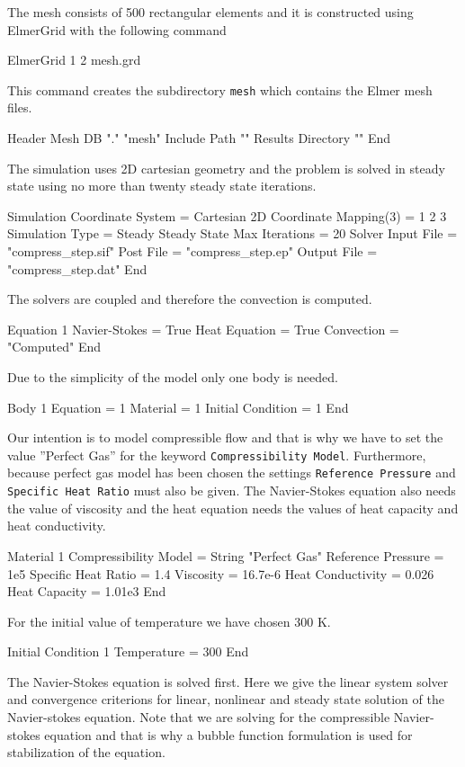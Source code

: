 \begin{flushleft}

The mesh consists of 500 rectangular elements and it is constructed using ElmerGrid with the following command

\ttbegin
ElmerGrid 1 2 mesh.grd
\ttend

This command creates the subdirectory {\tt mesh} which contains the Elmer mesh files.

\ttbegin
Header
  Mesh DB "." "mesh"
  Include Path ""
  Results Directory ""
End
\ttend

The simulation uses 2D cartesian geometry and the problem is solved in steady state using no more than twenty steady state iterations.

\ttbegin
Simulation
  Coordinate System =  Cartesian 2D
  Coordinate Mapping(3) = 1 2 3
  Simulation Type = Steady
  Steady State Max Iterations = 20
  Solver Input File = "compress_step.sif"
  Post File = "compress_step.ep"
  Output File = "compress_step.dat"
End
\ttend

The solvers are coupled and therefore the convection is computed. 

\ttbegin
Equation 1
  Navier-Stokes = True
  Heat Equation = True
  Convection = "Computed"
End
\ttend

Due to the simplicity of the model only one body is needed.

\ttbegin
Body 1
  Equation = 1
  Material = 1
  Initial Condition = 1
End
\ttend

Our intention is to model compressible flow and that is why we have to set the value ''Perfect Gas'' for the keyword {\tt Compressibility Model}. Furthermore, because perfect gas model has been chosen the settings {\tt Reference Pressure} and {\tt Specific Heat Ratio} must also be given. The Navier-Stokes equation also needs the value of viscosity and the heat equation needs the values of heat capacity and heat conductivity.

\ttbegin
Material 1
  Compressibility Model = String "Perfect Gas"
  Reference Pressure = 1e5
  Specific Heat Ratio = 1.4
  Viscosity = 16.7e-6
  Heat Conductivity = 0.026
  Heat Capacity = 1.01e3
End
\ttend

For the initial value of temperature we have chosen 300 K.

\ttbegin
Initial Condition 1
  Temperature = 300
End
\ttend

The Navier-Stokes equation is solved first. Here we give the linear system solver and convergence criterions for linear, nonlinear and steady state solution of the Navier-stokes equation. Note that we are solving for the compressible Navier-stokes equation and that is why a bubble function formulation is used for stabilization of the equation.



\end{flushleft}
